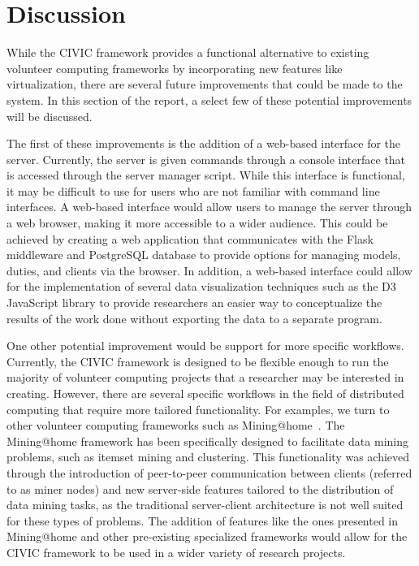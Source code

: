 \documentclass[11pt]{article}
\begin{document}
\section{Discussion}

While the CIVIC framework provides a functional alternative to existing volunteer computing frameworks by incorporating new features like virtualization, there are several future improvements that could be made to the system. In this section of the report, a select few of these potential improvements will be discussed. 

The first of these improvements is the addition of a web-based interface for the server. Currently, the server is given commands through a console interface that is accessed through the server manager script. While this interface is functional, it may be difficult to use for users who are not familiar with command line interfaces. A web-based interface would allow users to manage the server through a web browser, making it more accessible to a wider audience. This could be achieved by creating a web application that communicates with the Flask middleware and PostgreSQL database to provide options for managing models, duties, and clients via the browser. In addition, a web-based interface could allow for the implementation of several data visualization techniques such as the D3 JavaScript library to provide researchers an easier way to conceptualize the results of the work done without exporting the data to a separate program.

One other potential improvement would be support for more specific workflows. Currently, the CIVIC framework is designed to be flexible enough to run the majority of volunteer computing projects that a researcher may be interested in creating. However, there are several specific workflows in the field of distributed computing that require more tailored functionality. For examples, we turn to other volunteer computing frameworks such as Mining@home~\cite{Lucchese2010}. The Mining@home framework has been specifically designed to facilitate data mining problems, such as itemset mining and clustering. This functionality was achieved through the introduction of peer-to-peer communication between clients (referred to as miner nodes) and new server-side features tailored to the distribution of data mining tasks, as the traditional server-client architecture is not well suited for these types of problems. The addition of features like the ones presented in Mining@home and other pre-existing specialized frameworks would allow for the CIVIC framework to be used in a wider variety of research projects.
\end{document}
